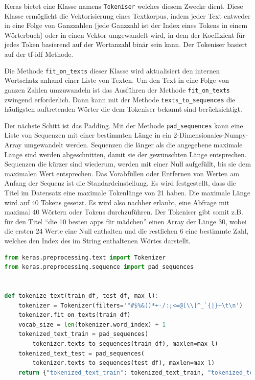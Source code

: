 Keras bietet eine Klasse namens \texttt{Tokeniser} welches diesem Zwecke dient. Diese Klasse ermöglicht die Vektorisierung eines Textkorpus, indem jeder Text entweder in eine Folge von Ganzzahlen (jede Ganzzahl ist der Index eines Tokens in einem Wörterbuch) oder in einen Vektor umgewandelt wird, in dem der Koeffizient für jedes Token basierend auf der Wortanzahl binär sein kann. Der Tokeniser basiert auf der tf-idf Methode.

Die Methode \texttt{fit\_on\_texts} dieser Klasse wird aktualisiert den internen Wortschatz anhand einer Liste von Texten. Um den Text in eine Folge von ganzen Zahlen umzuwandeln ist das Ausführen der Methode \texttt{fit\_on\_texts} zwingend erforderlich. Dann kann mit der Methode \texttt{texts\_to\_sequences} die häufigsten auftretenden Wörter die dem Tokeniser bekannt sind berücksichtigt.

Der nächste Schitt ist das Padding. Mit der Methode \texttt{pad\_sequences} kann eine Liste von Sequenzen mit einer bestimmten Länge in ein 2-Dimensionales-Numpy-Array umgewandelt werden. Sequenzen die länger als die angegebene maximale Länge sind werden abgeschnitten, damit sie der gewünschten Länge entsprechen. Sequenzen die kürzer sind wiederum, werden mit einer Null aufgefüllt, bis sie dem maximalen Wert entsprechen. Das Vorabfüllen oder Entfernen von Werten am Anfang der Sequenz ist die Standardeinstellung. Es wird festgestellt, dass die Titel im Datensatz eine maximale Tokenlänge von 21 haben. Die maximale Länge wird auf 40 Tokens gesetzt. Es wird also nachher erlaubt, eine Abfrage mit maximal 40 Wörtern oder Tokens durchzuführen. Der Tokeniser gibt somit z.B. für den Titel \enquote{die 10 besten apps für mädchen} einen Array der Länge 30, wobei die ersten 24 Werte eine Null enthalten und die restlichen 6 eine bestimmte Zahl, welches den Index des im String enthaltenen Wörtes darstellt. 



\begin{lstlisting}[language=Python,caption=Die Tokeniser-Funktion, label={TokenizerFunc}]
from keras.preprocessing.text import Tokenizer
from keras.preprocessing.sequence import pad_sequences


def tokenize_text(train_df, test_df, max_l):
    tokenizer = Tokenizer(filters='"#$%&()*+-/:;<=@[\\]^_`{|}~\t\n')
    tokenizer.fit_on_texts(train_df)
    vocab_size = len(tokenizer.word_index) + 1
    tokenized_text_train = pad_sequences(
        tokenizer.texts_to_sequences(train_df), maxlen=max_l)
    tokenized_text_test = pad_sequences(
        tokenizer.texts_to_sequences(test_df), maxlen=max_l)
    return {"tokenized_text_train": tokenized_text_train, "tokenized_text_test": tokenized_text_test, "vocab_size": vocab_size, "tokenizer": tokenizer}
\end{lstlisting}


